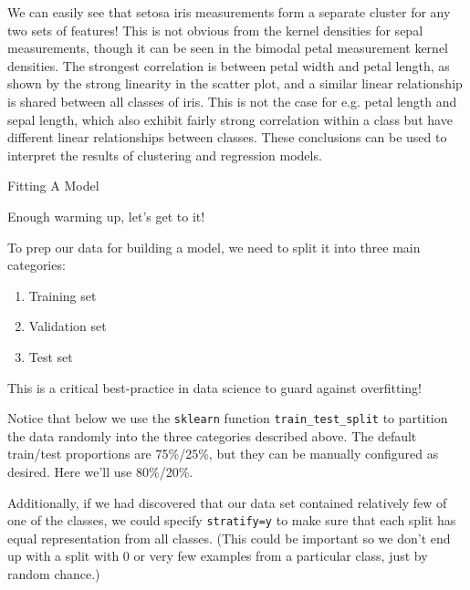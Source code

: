 \documentclass[8pt]{extarticle}
\providecommand{\tightlist}{%
      \setlength{\itemsep}{0pt}\setlength{\parskip}{0pt}}
\begin{document}
    We can easily see that setosa iris measurements form a separate cluster
for any two sets of features! This is not obvious from the kernel
densities for sepal measurements, though it can be seen in the bimodal
petal measurement kernel densities. The strongest correlation is between
petal width and petal length, as shown by the strong linearity in the
scatter plot, and a similar linear relationship is shared between all
classes of iris. This is not the case for e.g. petal length and sepal
length, which also exhibit fairly strong correlation within a class but
have different linear relationships between classes. These conclusions
can be used to interpret the results of clustering and regression
models.

    Fitting A Model

    Enough warming up, let's get to it!

To prep our data for building a model, we need to split it into three
main categories:

\begin{enumerate}
\def\labelenumi{\arabic{enumi}.}
\tightlist
\item
  Training set
\item
  Validation set
\item
  Test set
\end{enumerate}

This is a critical best-practice in data science to guard against
overfitting!

Notice that below we use the \texttt{sklearn} function
\texttt{train\_test\_split} to partition the data randomly into the
three categories described above. The default train/test proportions are
75\%/25\%, but they can be manually configured as desired. Here we'll
use 80\%/20\%.

Additionally, if we had discovered that our data set contained
relatively few of one of the classes, we could specify
\texttt{stratify=y} to make sure that each split has equal
representation from all classes. (This could be important so we don't
end up with a split with 0 or very few examples from a particular class,
just by random chance.)
\end{document}
